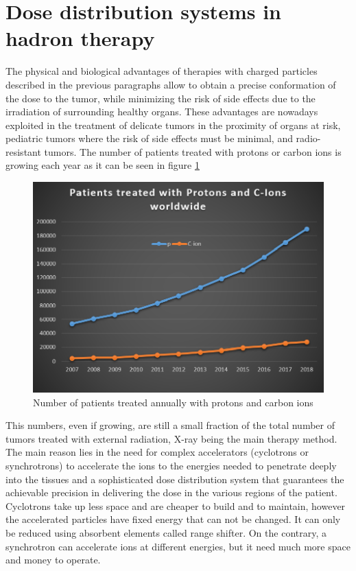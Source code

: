 \section{Dose distribution systems in hadron therapy}
The physical and biological advantages of therapies with charged particles described in the previous paragraphs allow to obtain a precise conformation of the dose to the tumor, while minimizing the risk of side effects due to the irradiation of surrounding healthy organs.
These advantages are nowadays exploited in the treatment of delicate tumors in the proximity of organs at risk, pediatric tumors where the risk of side effects must be minimal, and radio-resistant tumors.
The number of patients treated with protons or carbon ions is growing each year as it can be seen in figure \ref{fig:patientstreated}
\begin{figure}[H]
	\centering
	\includegraphics[width=0.7\linewidth]{IMG/ch1/PatientsTreated}
	\caption{Number of patients treated annually with protons and carbon ions}
	\label{fig:patientstreated}
\end{figure}
\noindent This numbers, even if growing, are still a small fraction of the total number of tumors treated with external radiation, X-ray being the main therapy method. 
The main reason lies in the need for complex accelerators (cyclotrons or synchrotrons) to accelerate the ions to
the energies needed to penetrate deeply into the tissues and a sophisticated dose distribution system that guarantees the achievable precision in delivering the dose in the various regions of the patient.
\newline
Cyclotrons take up less space and are cheaper to build and to maintain, however the accelerated particles have fixed energy that can not be changed. It can only be reduced using absorbent elements called range shifter.
On the contrary, a synchrotron can accelerate ions at different energies, but it need much more space and money to operate.
